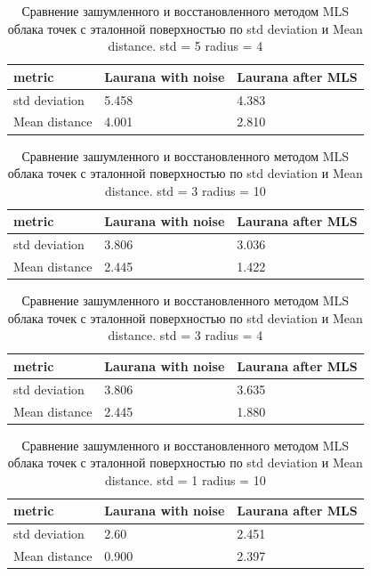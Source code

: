 \begin{table}[h!]
\centering
\begin{tabular}{|p{3cm} |p{2cm}| p{3cm} |}
    \hline
    metric & Laurana with noise & Laurana after MLS \\
    \hline\hline
    std deviation & 5.458 &  4.383 \\
    \hline
    Mean distance & 4.001 &   2.810 \\
    \hline
\end{tabular}
\caption{Сравнение зашумленного и восстановленного методом MLS облака точек с эталонной поверхностью по std deviation и Mean distance. std = 5 radius = 4}
\label{table:1}
\end{table}

\begin{table}[h!]
\centering
\begin{tabular}{|p{3cm} |p{2cm}| p{3cm} |}
    \hline
    metric & Laurana with noise & Laurana after MLS \\
    \hline\hline
    std deviation & 3.806 &  3.036 \\
    \hline
    Mean distance & 2.445 &   1.422 \\
    \hline
\end{tabular}
\caption{Сравнение зашумленного и восстановленного методом MLS облака точек с эталонной поверхностью по std deviation и Mean distance. std = 3 radius = 10}
\label{table:1}
\end{table}

\begin{table}[h!]
\centering
\begin{tabular}{|p{3cm} |p{2cm}| p{3cm} |}
    \hline
    metric & Laurana with noise & Laurana after MLS \\
    \hline\hline
    std deviation & 3.806 &  3.635 \\
    \hline
    Mean distance & 2.445 &   1.880 \\
    \hline
\end{tabular}
\caption{Сравнение зашумленного и восстановленного методом MLS облака точек с эталонной поверхностью по std deviation и Mean distance. std = 3 radius = 4}
\label{table:1}
\end{table}

\begin{table}[h!]
\centering
\begin{tabular}{|p{3cm} |p{2cm}| p{3cm} |}
    \hline
    metric & Laurana with noise & Laurana after MLS \\
    \hline\hline
    std deviation & 2.60 &  2.451 \\
    \hline
    Mean distance &  0.900 &   2.397 \\
    \hline
\end{tabular}
\caption{Сравнение зашумленного и восстановленного методом MLS облака точек с эталонной поверхностью по std deviation и Mean distance. std = 1 radius = 10}
\label{table:1}
\end{table}

